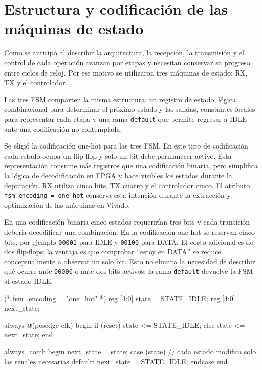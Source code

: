 \section{Estructura y codificación de las máquinas de estado}

Como se anticipó al describir la arquitectura, la recepción, la
transmisión y el control de cada operación avanzan por etapas y
necesitan conservar su progreso entre ciclos de reloj. Por ese motivo
se utilizaron tres máquinas de estado: RX, TX y el controlador.

Las tres FSM comparten la misma estructura: un registro de estado,
lógica combinacional para determinar el próximo estado y las salidas,
constantes locales para representar cada etapa y una rama
\texttt{default} que permite regresar a IDLE ante una codificación no
contemplada.

Se eligió la codificación one-hot para las tres FSM. En este tipo de
codificación cada estado ocupa un flip-flop y solo un bit debe
permanecer activo. Esta representación consume más registros que una
codificación binaria, pero simplifica la lógica de decodificación en
FPGA y hace visibles los estados durante la depuración. RX utiliza
cinco bits, TX cuatro y el controlador cinco. El atributo
\texttt{fsm\_encoding = one\_hot} conserva esta intención durante la
extracción y optimización de las máquinas en Vivado.

En una codificación binaria cinco estados requerirían tres bits y
cada transición debería decodificar una combinación. En la
codificación one-hot se reservan cinco bits, por ejemplo
\texttt{00001} para IDLE y \texttt{00100} para DATA. El costo
adicional es de dos flip-flops; la ventaja es que comprobar ``estoy
en DATA'' se reduce conceptualmente a observar un solo bit. Esto no
elimina la necesidad de describir qué ocurre ante \texttt{00000} o
ante dos bits activos: la rama \texttt{default} devuelve la FSM al estado IDLE.

\begin{codebox}[language=SystemVerilog]
(* fsm_encoding = "one_hot" *) reg [4:0] state = STATE_IDLE;
reg [4:0] next_state;

always @(posedge clk) begin
  if (reset)
    state <= STATE_IDLE;
  else
    state <= next_state;
end

always_comb begin
  next_state = state;
  case (state)
    // cada estado modifica solo las senales necesarias
    default: next_state = STATE_IDLE;
  endcase
end
\end{codebox}

